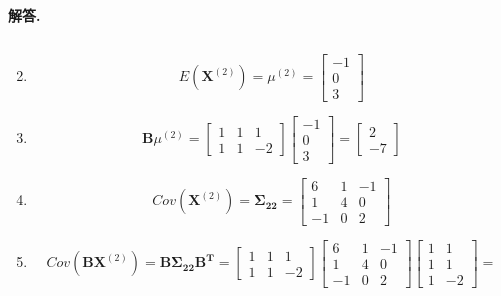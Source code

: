 \documentclass[12pt, a4paper, oneside]{ctexart}
\newenvironment{solution}{\par\noindent\textbf{解答. }}{\par}
\begin{document}
\begin{solution}
\begin{enumerate}[label=(\alph*)]
\[        \]
        \item 
        \[
            E(\mathbf{X}^{(2)})=\mu^{(2)}=
            \begin{bmatrix}
                -1\\
                0\\
                3
            \end{bmatrix}
        \]
        \item 
        \[
            \mathbf{B}\mu^{(2)}=
            \begin{bmatrix}
                1 & 1 & 1\\
                1 & 1 & -2
            \end{bmatrix}
            \begin{bmatrix}
                -1\\
                0\\
                3
            \end{bmatrix}
            =
            \begin{bmatrix}
                2\\
                -7
            \end{bmatrix}
        \]
        \item 
        \[
            Cov(\mathbf{X}^{(2)})=\bm{\Sigma_{22}}=
            \begin{bmatrix}
                6 & 1 & -1 \\
                1 & 4 & 0\\
                -1 & 0 & 2
            \end{bmatrix}
        \] 
        \item 
        \[
            Cov(\mathbf{B}\mathbf{X}^{(2)})=\mathbf{B}\bm{\Sigma_{22}}\mathbf{B^T}=
            \begin{bmatrix}
                1 & 1 & 1\\
                1 & 1 & -2
            \end{bmatrix}
            \begin{bmatrix}
                6 & 1 & -1 \\
                1 & 4 & 0\\
                -1 & 0 & 2
            \end{bmatrix}
            \begin{bmatrix}
                1 & 1 \\
                1 & 1\\
                1 & -2
            \end{bmatrix}=
\]
\end{enumerate}
\end{solution}
\end{document}
